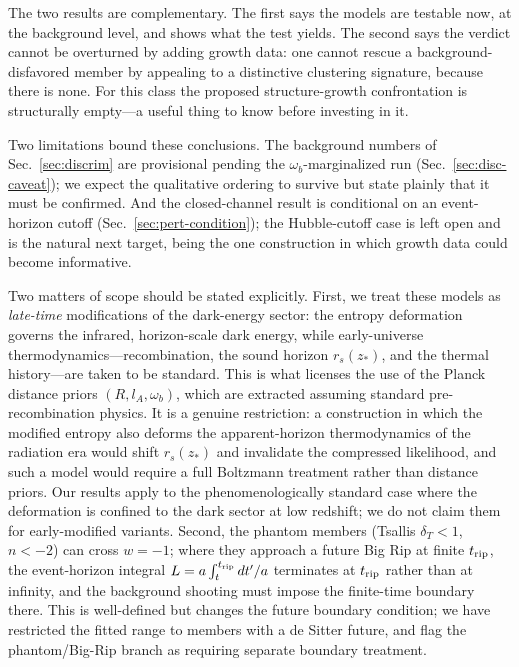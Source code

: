 \documentclass[twocolumn,10pt]{article}
\begin{document}
The two results are complementary. The first says the models are testable now,
at the background level, and shows what the test yields. The second says the
verdict cannot be overturned by adding growth data: one cannot rescue a
background-disfavored member by appealing to a distinctive clustering signature,
because there is none. For this class the proposed structure-growth
confrontation is structurally empty---a useful thing to know before investing
in it.

Two limitations bound these conclusions. The background numbers of
Sec.~\ref{sec:discrim} are provisional pending the $\omega_b$-marginalized
run (Sec.~\ref{sec:disc-caveat}); we expect the qualitative
ordering to survive but state plainly that it must be confirmed. And the
closed-channel result is conditional on an event-horizon cutoff
(Sec.~\ref{sec:pert-condition}); the Hubble-cutoff case is left open and is the
natural next target, being the one construction in which growth data could
become informative.

Two matters of scope should be stated explicitly. First, we treat these models
as \emph{late-time} modifications of the dark-energy sector: the entropy
deformation governs the infrared, horizon-scale dark energy, while
early-universe thermodynamics---recombination, the sound horizon $r_s(z_*)$,
and the thermal history---are taken to be standard. This is what licenses the
use of the Planck distance priors $(R,l_A,\omega_b)$, which are extracted
assuming standard pre-recombination physics. It is a genuine restriction: a
construction in which the modified entropy also deforms the apparent-horizon
thermodynamics of the radiation era would shift $r_s(z_*)$ and invalidate the
compressed likelihood, and such a model would require a full Boltzmann
treatment rather than distance priors. Our results apply to the
phenomenologically standard case where the deformation is confined to the dark
sector at low redshift; we do not claim them for early-modified variants.
Second, the phantom members (Tsallis $\delta_T<1$, $n<-2$) can cross $w=-1$;
where they approach a future Big Rip at finite $t_{\rm rip}$, the event-horizon
integral $L=a\int_t^{t_{\rm rip}}dt'/a$ terminates at $t_{\rm rip}$ rather than
at infinity, and the background shooting must impose the finite-time boundary
there. This is well-defined but changes the future boundary condition; we have
restricted the fitted range to members with a de Sitter future, and flag the
phantom/Big-Rip branch as requiring separate boundary treatment.
\end{document}
